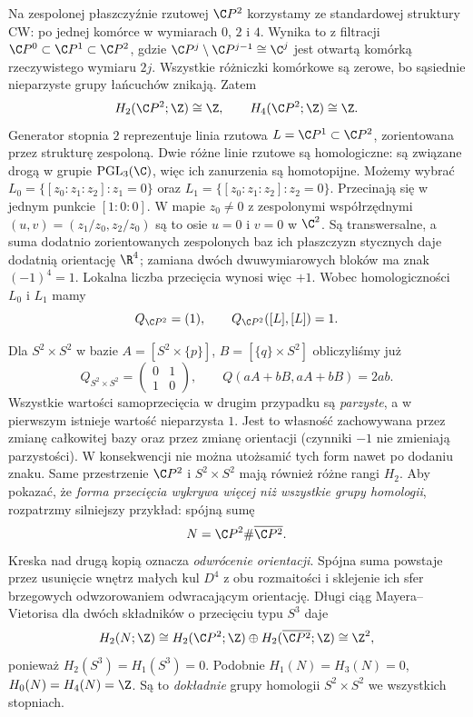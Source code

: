 \begin{przyklad}
\label{prz:formy-przeciecia-cp2-s2}
Na zespolonej płaszczyźnie rzutowej $\C P^2$
korzystamy ze standardowej struktury CW:
po jednej komórce w wymiarach $0$, $2$ i $4$.
Wynika to z filtracji
$\C P^0\subset\C P^1\subset\C P^2$,
gdzie $\C P^j\setminus\C P^{j-1}\cong\C^j$
jest otwartą komórką rzeczywistego wymiaru $2j$.
Wszystkie różniczki komórkowe są zerowe,
bo sąsiednie nieparzyste grupy łańcuchów znikają.
Zatem
\[
 H_2(\C P^2;\Z)\cong\Z,\qquad
 H_4(\C P^2;\Z)\cong\Z.
\]
Generator stopnia $2$ reprezentuje
linia rzutowa $L=\C P^1\subset\C P^2$,
zorientowana przez strukturę zespoloną.
Dwie różne linie rzutowe są homologiczne:
są związane drogą w grupie
$\mathrm{PGL}_3(\C)$, więc ich zanurzenia
są homotopijne. Możemy wybrać
$L_0=\{[z_0:z_1:z_2]:z_1=0\}$
oraz
$L_1=\{[z_0:z_1:z_2]:z_2=0\}$.
Przecinają się w jednym punkcie $[1:0:0]$.
W mapie $z_0\ne0$ z zespolonymi
współrzędnymi $(u,v)=(z_1/z_0,z_2/z_0)$
są to osie $u=0$ i $v=0$ w $\C^2$.
Są transwersalne, a suma dodatnio
zorientowanych zespolonych baz ich
płaszczyzn stycznych daje dodatnią
orientację $\R^4$; zamiana dwóch
dwuwymiarowych bloków ma znak $(-1)^4=1$.
Lokalna liczba przecięcia wynosi więc $+1$.
Wobec homologiczności $L_0$ i $L_1$ mamy
\[
 Q_{\C P^2}= (1),\qquad
 Q_{\C P^2}([L],[L])=1.
\]

Dla $S^2\times S^2$ w bazie
$A=[S^2\times\{p\}]$, $B=[\{q\}\times S^2]$
obliczyliśmy już
\[
 Q_{S^2\times S^2}
 =\begin{pmatrix}0&1\\1&0\end{pmatrix},
 \qquad Q(aA+bB,aA+bB)=2ab.
\]
Wszystkie wartości samoprzecięcia
w drugim przypadku są \emph{parzyste},
a w pierwszym istnieje wartość nieparzysta $1$.
Jest to własność zachowywana przez zmianę
całkowitej bazy oraz przez zmianę orientacji
(czynniki $-1$ nie zmieniają parzystości).
W konsekwencji nie można utożsamić
tych form nawet po dodaniu znaku.
Same przestrzenie $\C P^2$ i $S^2\times S^2$
mają również różne rangi $H_2$.
Aby pokazać, że \emph{forma przecięcia wykrywa więcej
niż wszystkie grupy homologii}, rozpatrzmy
silniejszy przykład: spójną sumę
\[
 N=\C P^2\#\overline{\C P^2}.
\]
Kreska nad drugą kopią oznacza \emph{odwrócenie
orientacji}. Spójna suma powstaje przez
usunięcie wnętrz małych kul $D^4$ z obu
rozmaitości i sklejenie ich sfer brzegowych
odwzorowaniem odwracającym orientację.
Długi ciąg Mayera--Vietorisa dla dwóch
składników o przecięciu typu $S^3$ daje
\[
 H_2(N;\Z)\cong
 H_2(\C P^2;\Z)\oplus
 H_2(\overline{\C P^2};\Z)\cong\Z^2,
\]
ponieważ $H_2(S^3)=H_1(S^3)=0$.
Podobnie $H_1(N)=H_3(N)=0$,
$H_0(N)=H_4(N)=\Z$.
Są to \emph{dokładnie} grupy homologii
$S^2\times S^2$ we wszystkich stopniach.


\end{przyklad}
